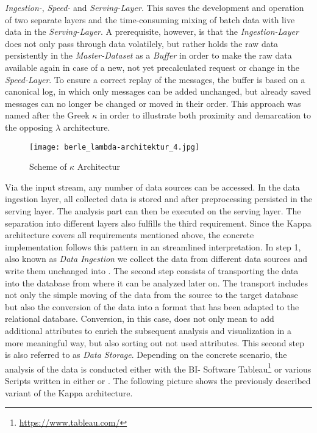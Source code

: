 \textit{Ingestion-}, \textit{Speed-} and \textit{Serving-Layer}.
This saves the development and operation of two separate layers and the time-consuming mixing of batch data with live data in the \textit{Serving-Layer}.
A prerequisite, however, is that the \textit{Ingestion-Layer} does not only pass through data volatilely,
but rather holds the raw data persistently in the \textit{Master-Dataset} as a \textit{Buffer} in order to make the raw data available again in case of a new,
not yet precalculated request or change in the \textit{Speed-Layer}.
To ensure a correct replay of the messages, the buffer is based on a canonical log, in which only messages can be added unchanged, but already saved messages can no
longer be changed or moved in their order.
This approach was named after the Greek $\kappa$ in order to illustrate both proximity and demarcation to the opposing $\lambda$ architecture.
\cite{Kappa} \cite{Kappa2}
\begin{figure}[h]
	\centering
	\texttt{[image: berle\_lambda-architektur\_4.jpg]}
	\caption[Scheme of $\kappa$ Architectur]{Scheme of $\kappa$ Architectur\cite{jaxkappa}}
	\label{fig:KappaArchitecture}
\end{figure}
Via the input stream, any number of data sources can be accessed. In the
data ingestion layer, all collected data is stored and after preprocessing persisted in the serving layer. %
The analysis part can then be executed on the serving layer.
The separation into different layers also fulfills the third requirement. Since the Kappa architecture covers all requirements mentioned above, the concrete implementation follows this pattern in an streamlined interpretation.
\newline
\newline
In step 1, also known as \textit{Data Ingestion} we collect the data from different data sources and write them unchanged into \gds{}.
The second step consists of transporting the data into the \pg{} database from where it can be analyzed later on.
The transport includes not only the simple moving of the data from the source to the target database but also the conversion of the data
into a format that has been adapted to the relational database.
Conversion, in this case, does not only mean to add additional attributes to enrich the subsequent analysis and visualization in a more meaningful way,
but also sorting out not used attributes. This second step is also referred to as \textit{Data Storage}.
Depending on the concrete scenario, the analysis of the data is conducted either with the BI- Software Tableau\footnote{\url{https://www.tableau.com/}} or various Scripts written in either  or .
\newline
The following picture shows the previously described variant of the Kappa architecture.
